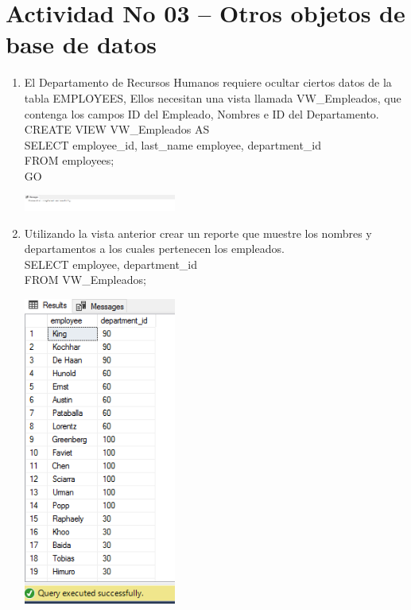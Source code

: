 \section{Actividad No 03 –  Otros objetos de base de datos} 
		
\begin{enumerate}[1.]
	\item El Departamento de Recursos Humanos requiere ocultar ciertos datos de la tabla EMPLOYEES, Ellos necesitan una vista llamada VW\_Empleados, que contenga los campos ID del Empleado, Nombres e ID del Departamento.
	\\CREATE VIEW VW\_Empleados AS
	\\SELECT employee\_id, last\_name employee, department\_id
	\\FROM employees;
	\\GO
	\begin{center}
	\includegraphics[width=5cm]{./Imagenes/actividad_03_01}
	\end{center}
	\item Utilizando la vista anterior crear un reporte que muestre los nombres y departamentos a los cuales
pertenecen los empleados.
	\\SELECT employee, department\_id
	\\FROM VW\_Empleados;
	\begin{center}
	\includegraphics[width=5cm]{./Imagenes/actividad_03_02}
	\end{center}
	

\end{enumerate}
